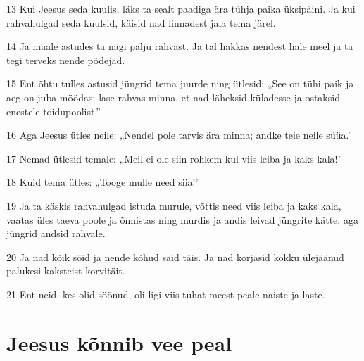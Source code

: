 \par 13 Kui Jeesus seda kuulis, läks ta sealt paadiga ära tühja paika üksipäini. Ja kui rahvahulgad seda kuulsid, käisid nad linnadest jala tema järel.
\par 14 Ja maale astudes ta nägi palju rahvast. Ja tal hakkas nendest hale meel ja ta tegi terveks nende põdejad.
\par 15 Ent õhtu tulles astusid jüngrid tema juurde ning ütlesid: „See on tühi paik ja aeg on juba möödas; lase rahvas minna, et nad läheksid küladesse ja ostaksid enestele toidupoolist.”
\par 16 Aga Jeesus ütles neile: „Nendel pole tarvis ära minna; andke teie neile süüa.”
\par 17 Nemad ütlesid temale: „Meil ei ole siin rohkem kui viis leiba ja kaks kala!”
\par 18 Kuid tema ütles: „Tooge mulle need siia!”
\par 19 Ja ta käskis rahvahulgad istuda murule, võttis need viis leiba ja kaks kala, vaatas üles taeva poole ja õnnistas ning murdis ja andis leivad jüngrite kätte, aga jüngrid andsid rahvale.
\par 20 Ja nad kõik sõid ja nende kõhud said täis. Ja nad korjasid kokku ülejäänud palukesi kaksteist korvitäit.
\par 21 Ent neid, kes olid söönud, oli ligi viis tuhat meest peale naiste ja laste.

\section*{Jeesus kõnnib vee peal}

